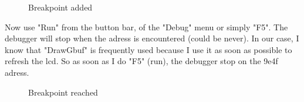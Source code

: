\documentclass[10pt]{report}
\begin{document}
\begin{figure}[H]
\centering
{}
\caption{Breakpoint added}
\end{figure}

Now use "Run" from the button bar, of the "Debug" menu or simply "F5".\newline
The debugger will stop when the adress is encountered (could be never).\newline
In our case, I know that "DrawGbuf" is frequently used because I use it as soon as possible to refresh the lcd.\newline
So as soon as I do "F5" (run), the debugger stop on the 9e4f adress.\newline

\begin{figure}[H]
\centering
{}
\caption{Breakpoint reached}
\end{figure}
\end{document}
